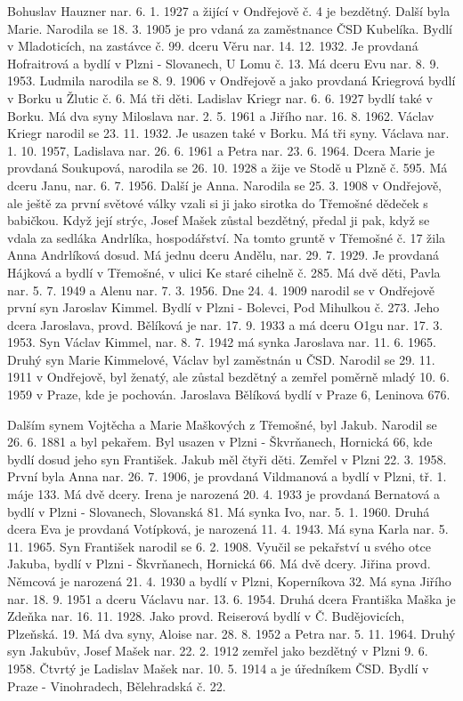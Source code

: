 \documentclass[../dejiny-rodu-prusiku.tex]{subfiles}
\begin{document}
Bohuslav Hauzner nar. 6. 1. 1927 a žijící v Ondřejově č. 4  je bezdětný. Další byla Marie. Narodila se 18. 3. 1905 je pro vdaná za zaměstnance ČSD Kubelíka. Bydlí v Mladoticích, na zastávce č. 99. dceru Věru nar. 14. 12. 1932. Je provdaná Hofraitrová a bydlí v Plzni - Slovanech, U Lomu č. 13. Má dceru Evu nar. 8. 9. 1953. Ludmila narodila se 8. 9. 1906 v Ondřejově a jako provdaná Kriegrová bydlí v Borku u Žlutic č. 6. Má tři děti. Ladislav Kriegr nar. 6. 6. 1927 bydlí také v Borku. Má dva syny Miloslava nar. 2. 5. 1961 a Jiřího nar. 16. 8. 1962. Václav Kriegr na­rodil se 23. 11. 1932. Je usazen také v Borku. Má tři sy­ny. Václava nar. 1. 10. 1957, Ladislava nar. 26. 6. 1961 a Petra nar. 23. 6. 1964. Dcera Marie je provdaná Soukupová, narodila se 26. 10. 1928 a žije ve Stodě u Plzně č. 595. Má dceru Janu, nar. 6. 7. 1956. Další je Anna. Narodila se 25. 3. 1908 v Ondřejově, ale ještě za první světové války vzali si ji jako sirotka do Třemošné dědeček s babičkou. Když její strýc, Josef Mašek zůstal bezdětný, předal ji pak, když se vdala za sedláka Andrlíka, hospodářství. Na tomto gruntě v Třemošné č. 17 žila  Anna Andrlíková dosud. Má jednu dceru Andělu, nar. 29. 7. 1929. Je provdaná Hájková a bydlí v Třemošné, v ulici Ke staré cihelně č. 285. Má dvě děti, Pavla nar. 5. 7. 1949 a Alenu nar. 7. 3. 1956. Dne 24. 4. 1909 narodil se v Ondřejově první syn Jaroslav Kimmel. Bydlí v Plzni - Bolevci, Pod Mihulkou č. 273. Jeho dcera Jaroslava, provd. Bělíková je nar. 17. 9. 1933 a má dceru O1gu nar. 17. 3. 1953. Syn Václav Kimmel, nar. 8. 7. 1942 má synka Jaroslava nar. 11. 6. 1965. Druhý syn Marie Kimmelové, Václav byl zaměstnán u ČSD. Narodil se  29. 11. 1911 v Ondřejově, byl ženatý, ale zůstal bezdětný a zemřel poměrně mladý 10. 6. 1959 v Praze, kde je pochován. Jaroslava Bělíková bydlí v Praze 6, Leninova 676.

Dalším synem Vojtěcha a Marie Maškových z Třemošné, byl Jakub. Narodil se 26. 6. 1881 a byl pekařem. Byl usazen v Plzni - Škvrňanech, Hornická 66, kde bydlí dosud jeho syn František. Jakub měl čtyři děti. Zemřel v Plzni 22. 3. 1958. První byla Anna nar. 26. 7. 1906, je provdaná Vildmanová a bydlí v Plzni, tř. 1. máje 133. Má dvě dcery. Irena je narozená 20. 4. 1933 je provdaná Bernatová a bydlí v Plzni - Slovanech, Slovanská 81. Má synka Ivo, nar. 5. 1. 1960. Druhá dcera Eva je provdaná Votípková, je narozená 11. 4. 1943. Má syna Karla nar. 5. 11. 1965. Syn František narodil se 6. 2. 1908. Vyučil se pekařství u svého otce Jakuba, bydlí v Plzni - Škvrňanech, Hornická 66. Má dvě dcery. Jiřina provd. Němcová je narozená 21. 4. 1930 a bydlí v Plzni, Koperníkova 32. Má syna Jiřího nar. 18. 9. 1951 a dceru Václavu nar. 13. 6. 1954. Druhá dcera Františka Maška je Zdeňka nar. 16. 11. 1928. Jako provd. Reiserová bydlí v Č. Budějovicích, Plzeňská. 19. Má dva syny, Aloise nar. 28. 8. 1952 a Petra nar. 5. 11. 1964. Druhý syn Jakubův, Josef Mašek nar. 22. 2. 1912 zemřel jako bezdětný v Plzni 9. 6. 1958. Čtvrtý je Ladislav Mašek nar. 10. 5. 1914 a je úředníkem ČSD. Bydlí v Praze - Vinohradech, Bělehradská č. 22.
\end{document}
